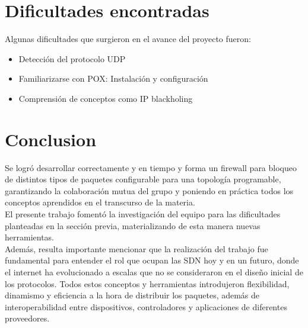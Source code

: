 \documentclass[titlepage,a4paper]{article}
\begin{document}
    \section{Dificultades encontradas}\label{sec:dificultadesEncontras}
    Algunas dificultades que surgieron en el avance del proyecto fueron:
    
    \begin{itemize}
        \item Detección del protocolo UDP
        \item Familiarizarse con POX: Instalación y configuración
        \item Comprensión de conceptos como IP blackholing
    \end{itemize}
    
\section{Conclusion}\label{conclusion}
    Se logró desarrollar correctamente y en tiempo y forma un firewall para bloqueo de distintos tipos de paquetes configurable para una topología programable, garantizando la colaboración mutua del grupo y poniendo en práctica todos los conceptos aprendidos en el transcurso de la materia.
    \\
    El presente trabajo fomentó la investigación del equipo para las dificultades planteadas en la sección previa, materializando de esta manera nuevas herramientas.
    \\
    Además, resulta importante mencionar que la realización del trabajo fue fundamental para entender el rol que ocupan las SDN hoy y en un futuro, donde el internet ha evolucionado a escalas que no se consideraron en el diseño inicial de los protocolos. Todos estos conceptos y herramientas introdujeron flexibilidad, dinamismo y eficiencia a la hora de distribuir los paquetes, además de interoperabilidad entre dispositivos, controladores y aplicaciones de diferentes proveedores.
\end{document}

